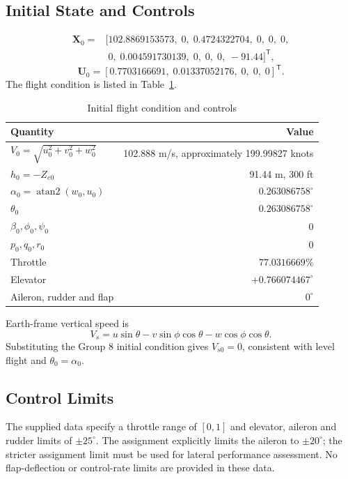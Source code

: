 \documentclass[a4paper,11pt]{article}
\begin{document}
\subsection{Initial State and Controls}
\begin{equation}
\begin{aligned}
\bm X_0={}&[102.8869153573,\;0,\;0.4724322704,\;0,\;0,\;0,\\
 &\phantom{[}0,\;0.004591730139,\;0,\;0,\;0,\;-91.44]^{\mathsf T},
\end{aligned}
\end{equation}
\begin{equation}
\bm U_0=[0.7703166691,\;0.01337052176,\;0,\;0,\;0]^{\mathsf T}.
\end{equation}
The flight condition is listed in Table~\ref{tab:trimpoint}.
\begin{table}[H]\centering
\caption{Initial flight condition and controls}\label{tab:trimpoint}
\begin{tabular}{lr}\toprule
Quantity&Value\\\midrule
$V_0=\sqrt{u_0^2+v_0^2+w_0^2}$&102.888 m/s, approximately 199.99827 knots\\
$h_0=-Z_{e0}$&91.44 m, 300 ft\\
$\alpha_0=\operatorname{atan2}(w_0,u_0)$&$0.263086758^\circ$\\
$\theta_0$&$0.263086758^\circ$\\
$\beta_0,\phi_0,\psi_0$&$0$\\
$p_0,q_0,r_0$&$0$\\
Throttle&$77.0316669\%$\\
Elevator&$+0.766074467^\circ$\\
Aileron, rudder and flap&$0^\circ$\\\bottomrule
\end{tabular}
\end{table}

Earth-frame vertical speed is
\begin{equation}\label{eq:vs}
V_s=u\sin\theta-v\sin\phi\cos\theta-w\cos\phi\cos\theta.
\end{equation}
Substituting the Group 8 initial condition gives $V_{s0}=0$, consistent with level flight and $\theta_0=\alpha_0$.

\subsection{Control Limits}
The supplied data specify a throttle range of $[0,1]$ and elevator, aileron and rudder limits of $\pm25^\circ$. The assignment explicitly limits the aileron to $\pm20^\circ$; the stricter assignment limit must be used for lateral performance assessment. No flap-deflection or control-rate limits are provided in these data.
\end{document}
